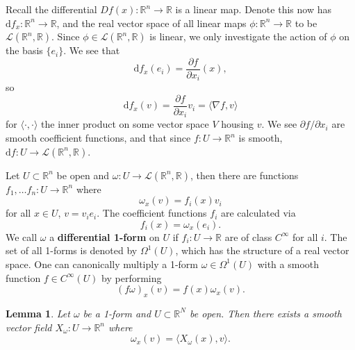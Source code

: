 \documentclass[letter-paper]{tufte-book}
\newtheorem{lemma}[theorem]{\color{pastel-blue}Lemma}
\begin{document}
Recall the differential $Df(x) : \mathbb{R}^n \to \mathbb{R}$ is a linear map.
Denote this now has $\mathrm{d}f_x : \mathbb{R}^n \to \mathbb{R}$, and the real
vector space of all linear maps $\phi : \mathbb{R}^n \to \mathbb{R}$ to be
$\mathcal{L}(\mathbb{R}^n, \mathbb{R})$. Since $\phi \in
\mathcal{L}(\mathbb{R}^n, \mathbb{R})$ is linear, we only investigate the action
of $\phi$ on the basis $\{e_i\}$. We see that
\begin{equation*}
  \mathrm{d}f_x (e_i) = \frac{\partial f}{\partial x_i}(x),
\end{equation*}
so
\begin{equation*}
  \mathrm{d}f_x (v) = \frac{\partial f}{\partial x_i} v_i = \langle \nabla f, v\rangle
\end{equation*}
for $\langle\cdot,\cdot\rangle$ the inner product on some vector space $V$
housing $v$. We see $\partial f / \partial x_i$ are smooth coefficient
functions, and that since $f: U \to \mathbb{R}^n$ is smooth, $\mathrm{d}f: U \to
\mathcal{L}(\mathbb{R}^n, \mathbb{R})$.

Let $U \subset \mathbb{R}^n$ be open and $\omega : U \to
\mathcal{L}(\mathbb{R}^n, \mathbb{R})$, then there are functions $f_1, \ldots
f_n : U \to \mathbb{R}^n$ where
\begin{equation}
  \omega_x(v) = f_i(x) v_i
\end{equation}
for all $x \in U$, $v = v_i e_i$. The coefficient functions $f_i$ are calculated
via
\begin{equation}
  f_i(x) = \omega_x(e_i).
\end{equation}
We call $\omega$ a \textbf{differential 1-form} on $U$ if $f_i : U \to
\mathbb{R}$ are of class $C^\infty$ for all $i$. The set of all 1-forms is
denoted by $\Omega^1(U)$, which has the structure of a real vector space. One
can canonically multiply a 1-form $\omega \in \Omega^1(U)$ with a smooth
function $f\in C^\infty(U)$ by performing
\begin{equation*}
  (f\omega)_x (v) = f(x) \omega_x(v).
\end{equation*}

\begin{lemma}
  Let $\omega$ be a 1-form and $U \subset \mathbb{R}^N$ be open. Then there
  exists a smooth vector field $X_\omega : U \to \mathbb{R}^n$ where
  \begin{equation*}
    \omega_x (v) = \langle X_\omega (x), v\rangle.
  \end{equation*}
\end{lemma}
\end{document}
